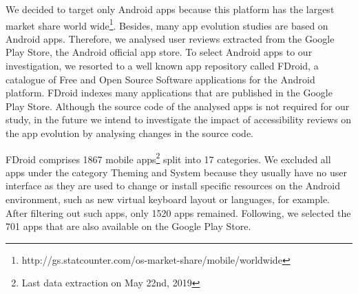 We decided to target only Android apps because this platform has the largest market share world wide\footnote{http://gs.statcounter.com/os-market-share/mobile/worldwide}. Besides, many app evolution studies are based on Android apps. 
Therefore, we analysed user reviews extracted from the Google Play Store, the Android official app store.
To select Android apps to our investigation, we resorted to a well known app repository called FDroid, a catalogue of Free and Open Source Software applications for the Android platform. FDroid indexes many applications that are published in the Google Play Store.
Although the source code of the analysed apps is not required for our study, in the future we intend to investigate the impact of accessibility reviews on the app evolution by analysing changes in the source code.

FDroid comprises 1867 mobile apps\footnote{Last data extraction on May 22nd, 2019} split into 17 categories. %
We excluded all apps under the category Theming and System because they usually have no user interface as they are used to change or install specific resources on the Android environment, such as new virtual keyboard layout or languages, for example. After filtering out such apps, only 1520 apps remained.
Following, we selected the 701 apps that are also available on the Google Play Store.



